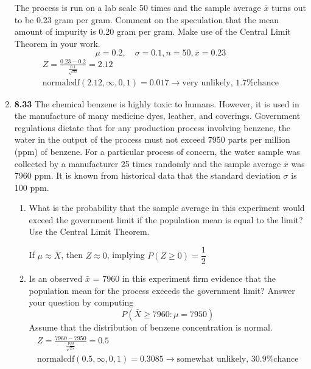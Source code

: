 \documentclass[basic, header]{nosvagor-notes}
\begin{document}
\begin{enumerate}[itemsep=2em]
      The process is run on a lab scale 50 times and the sample average \(\bar{x}\)
      turns out to be 0.23 gram per gram. Comment on the speculation that the
      mean amount of impurity is 0.20 gram per gram. Make use of the Central
      Limit Theorem in your work.
      \[%
        \mu = 0.2, \quad \sigma = 0.1, n = 50, \bar{x} = 0.23
      \]%
      \begin{align*}
        Z = \frac{0.23 - 0.2}{\tfrac{0.1}{\sqrt{50}}} = 2.12 \\
        \text{normalcdf}(2.12, \infty,0,1) = 0.017 \to \boxed{\text{very unlikely, 1.7\% chance}}
      \end{align*}

    \item \textbf{8.33} The chemical benzene is highly toxic to humans.
      However, it is used in the manufacture of many medicine dyes, leather,
      and coverings. Government regulations dictate that for any production
      process involving benzene, the water in the output of the process must
      not exceed 7950 parts per million (ppm) of benzene. For a particular
      process of concern, the water sample was collected by a manufacturer 25
      times randomly and the sample average \(\bar{x}\) was 7960 ppm. It is
      known from historical data that the standard deviation \(\sigma\) is 100
      ppm.
    \begin{enumerate}

      \item What is the probability that the sample average in this experiment
        would exceed the government limit if the population mean is equal to
        the limit? Use the Central Limit Theorem.

      If \(\mu \approx \bar{X}\), then \(Z \approx 0\), implying \(P(Z\geq0) = \boxed{\dfrac{1}{2}}\)


      \item Is an observed \(\bar{x}\) = 7960 in this experiment firm evidence
        that the population mean for the process exceeds the government limit?
        Answer your question by computing
        \[%
        P(\bar{X} \geq 7960 : \mu = 7950)
      \]%
      Assume that the distribution of benzene concentration is normal.
      \begin{align*}
        Z = \frac{7960 - 7950}{\frac{100}{\sqrt{25}}} = 0.5 \\
        \text{normalcdf}(0.5, \infty,0,1) = 0.3085 \to \boxed{\text{somewhat unlikely, 30.9\% chance}}
      \end{align*}


\end{enumerate}
\end{enumerate}
\end{document}
